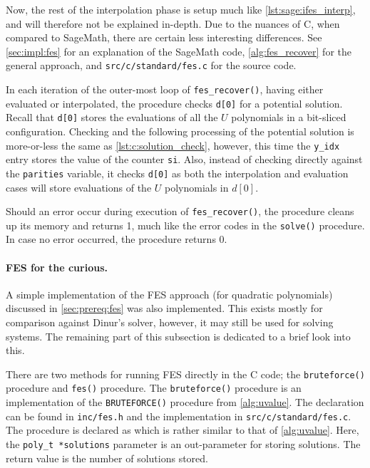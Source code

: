 Now, the rest of the interpolation phase is setup much like \cref{lst:sage:ifes_interp}, and will therefore not be explained in-depth. Due to the nuances of C, when compared to SageMath, there are certain less interesting differences. See \cref{sec:impl:fes} for an explanation of the SageMath code, \cref{alg:fes_recover} for the general approach, and \texttt{src/c/standard/fes.c} for the source code.

In each iteration of the outer-most loop of \texttt{fes\_recover()}, having either evaluated or interpolated, the procedure checks \texttt{d[0]} for a potential solution. Recall that \texttt{d[0]} stores the evaluations of all the $U$ polynomials in a bit-sliced configuration. Checking and the following processing of the potential solution is more-or-less the same as \cref{lst:c:solution_check}, however, this time the \texttt{y\_idx} entry stores the value of the counter \texttt{si}. Also, instead of checking directly against the \texttt{parities} variable, it checks \texttt{d[0]} as both the interpolation and evaluation cases will store evaluations of the $U$ polynomials in $d[0]$.

Should an error occur during execution of \texttt{fes\_recover()}, the procedure cleans up its memory and returns 1, much like the error codes in the \texttt{solve()} procedure. In case no error occurred, the procedure returns 0.

\paragraph{FES for the curious.} A simple implementation of the FES approach (for quadratic polynomials) discussed in \cref{sec:prereq:fes} was also implemented. This exists mostly for comparison against Dinur's solver, however, it may still be used for solving systems. The remaining part of this subsection is dedicated to a brief look into this.

There are two methods for running FES directly in the C code; the \texttt{bruteforce()} procedure and \texttt{fes()} procedure. The \texttt{bruteforce()} procedure is an implementation of the \texttt{BRUTEFORCE()} procedure from \cref{alg:uvalue}. The declaration can be found in \texttt{inc/fes.h} and the implementation in \texttt{src/c/standard/fes.c}. The procedure is declared as 
which is rather similar to that of \cref{alg:uvalue}. Here, the \texttt{poly\_t *solutions} parameter is an out-parameter for storing solutions. The return value is the number of solutions stored.

